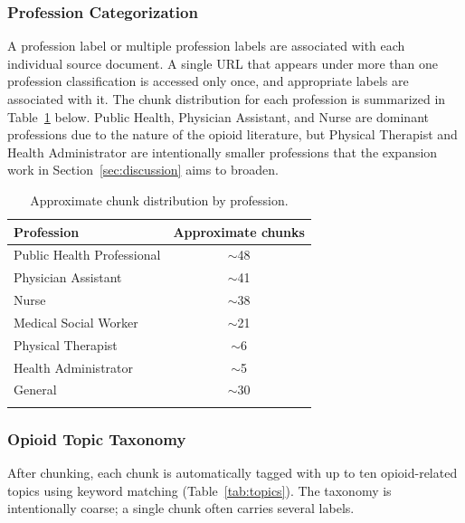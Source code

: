 \documentclass[pdflatex,sn-mathphys-num]{sn-jnl}
\theoremstyle{thmstyleone}
\theoremstyle{thmstyletwo}
\theoremstyle{thmstylethree}
\begin{document}
\subsubsection{Profession Categorization}

A profession label or multiple profession labels are associated with each individual source document. A single URL that appears under more than one profession classification is accessed only once, and appropriate labels are associated with it. The chunk distribution for each profession is summarized in Table~\ref{tab:chunks_by_profession} below. Public Health, Physician Assistant, and Nurse are dominant professions due to the nature of the opioid literature, but Physical Therapist and Health Administrator are intentionally smaller
professions that the expansion work in Section~\ref{sec:discussion} aims to broaden.

\begin{table}[h]
    \centering
    \caption{Approximate chunk distribution by profession.}
    \label{tab:chunks_by_profession}
    \begin{tabular}{@{}lc@{}}
        \toprule
        \textbf{Profession} & \textbf{Approximate chunks} \\
        \midrule
        Public Health Professional & $\sim$48 \\
        Physician Assistant     & $\sim$41 \\
        Nurse                   & $\sim$38 \\
        Medical Social Worker   & $\sim$21 \\
        Physical Therapist      & $\sim$6 \\
        Health Administrator    & $\sim$5 \\
        General                 & $\sim$30 \\
        \botrule
    \end{tabular}
\end{table}

\subsubsection{Opioid Topic Taxonomy}

After chunking, each chunk is automatically tagged with up to ten opioid-related topics using keyword matching (Table~\ref{tab:topics}). The taxonomy is intentionally coarse; a single chunk often carries several labels.
\end{document}
